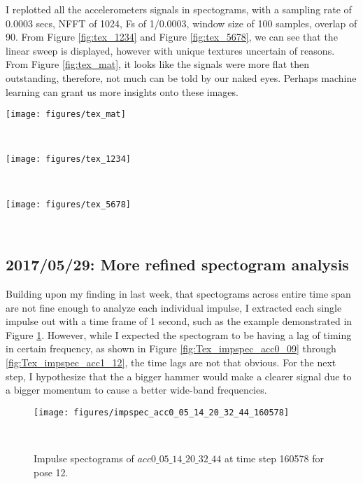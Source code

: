 \documentclass{sigchi}
\begin{document}
I replotted all the accelerometers signals in spectograms, with a sampling rate of 0.0003 secs, NFFT of 1024, Fs of 1/0.0003, window size of 100 samples, overlap of 90. From Figure \ref{fig:tex_1234} and Figure \ref{fig:tex_5678}, we can see that the linear sweep is displayed, however with unique textures uncertain of reasons. From Figure \ref{fig:tex_mat}, it looks like the signals were more flat then outstanding, therefore, not much can be told by our naked eyes. Perhaps machine learning can grant us more insights onto these images.

\begin{figure*}
  \centering
  \texttt{[image: figures/tex\_mat]}
  \caption{Spectograms for the four experiments previously on the signal difference hitting with different materials.}
    ~\label{fig:tex_mat}
\end{figure*}

\begin{figure*}
  \centering
  \texttt{[image: figures/tex\_1234]}
  \caption{Spectograms for the four experiments previously in Pose 1 through 4.}
    ~\label{fig:tex_1234}
\end{figure*}

\begin{figure*}
  \centering
  \texttt{[image: figures/tex\_5678]}
  \caption{Spectograms for the four experiments previously in Pose 5 through 8.}
    ~\label{fig:tex_5678}
\end{figure*}

\subsection{2017/05/29: More refined spectogram analysis}

Building upon my finding in last week, that spectograms across entire time span are not fine enough to analyze each individual impulse, I extracted each single impulse out with a time frame of 1 second, such as the example demonstrated in Figure \ref{fig:impspec_acc0_05_14_20_32_44_160578}. However, while I expected the spectogram to be having a lag of timing in certain frequency, as shown in Figure \ref{fig:Tex_impspec_acc0_09} through \ref{fig:Tex_impspec_acc1_12}, the time lags are not that obvious. For the next step, I hypothesize that the a bigger hammer would make a clearer signal due to a bigger momentum to cause a better wide-band frequencies.

\begin{figure}
  \centering
  \texttt{[image: figures/impspec\_acc0\_05\_14\_20\_32\_44\_160578]}
  \caption{Impulse spectograms of $acc0\_05\_14\_20\_32\_44$ at time step 160578 for pose 12.}
    ~\label{fig:impspec_acc0_05_14_20_32_44_160578}
\end{figure}
\end{document}
